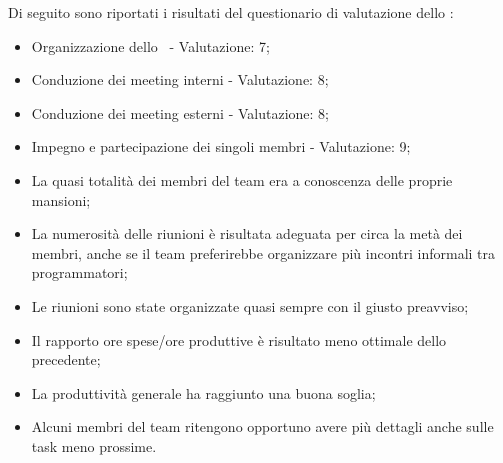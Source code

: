 \par Di seguito sono riportati i risultati del questionario di valutazione dello :
\begin{itemize}
  \item Organizzazione dello \ - Valutazione: 7;
  \item Conduzione dei meeting interni - Valutazione: 8;
  \item Conduzione dei meeting esterni - Valutazione: 8;
  \item Impegno e partecipazione dei singoli membri - Valutazione: 9;
  \item La quasi totalità dei membri del team era a conoscenza delle proprie mansioni;
  \item La numerosità delle riunioni è risultata adeguata per circa la metà dei membri, anche se il team preferirebbe organizzare più incontri informali tra programmatori;
  \item Le riunioni sono state organizzate quasi sempre con il giusto preavviso;
  \item Il rapporto ore spese/ore produttive è risultato meno ottimale dello  precedente;
  \item La produttività generale ha raggiunto una buona soglia;
  \item Alcuni membri del team ritengono opportuno avere più dettagli anche sulle task meno prossime.
\end{itemize}


